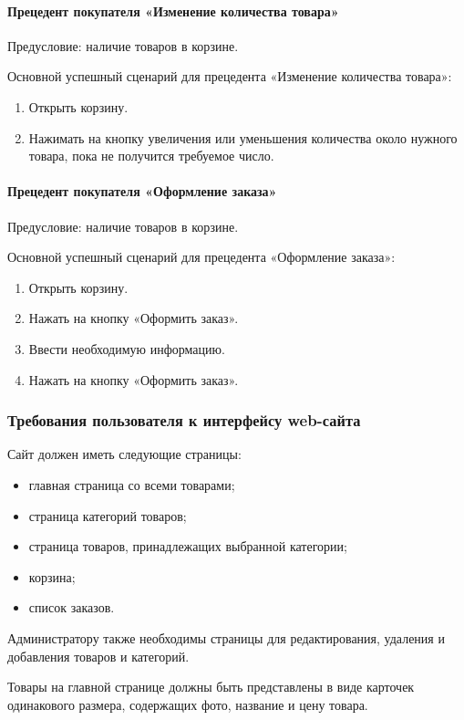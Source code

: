 \paragraph{Прецедент покупателя «Изменение количества товара»}
Предусловие: наличие товаров в корзине.

Основной успешный сценарий для прецедента «Изменение количества товара»:
\begin{enumerate}
	\item Открыть корзину.
	\item Нажимать на кнопку увеличения или уменьшения количества около нужного товара, пока не получится требуемое число.
\end{enumerate}

\paragraph{Прецедент покупателя «Оформление заказа»}
Предусловие: наличие товаров в корзине.

Основной успешный сценарий для прецедента «Оформление заказа»:
\begin{enumerate}
	\item Открыть корзину.
	\item Нажать на кнопку «Оформить заказ».
	\item Ввести необходимую информацию.
	\item Нажать на кнопку «Оформить заказ».
\end{enumerate}

\subsubsection{Требования пользователя к интерфейсу web-сайта}

Сайт должен иметь следующие страницы:
\begin{itemize}
	\item главная страница со всеми товарами;
	\item страница категорий товаров;
	\item страница товаров, принадлежащих выбранной категории;
	\item корзина;
	\item список заказов.
\end{itemize}

Администратору также необходимы страницы для редактирования, удаления и добавления товаров и категорий.

Товары на главной странице должны быть представлены в виде карточек одинакового размера, содержащих фото, название и цену товара.

